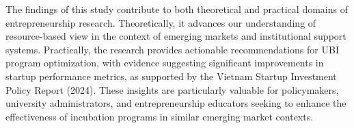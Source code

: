 \documentclass[../Main.tex]{subfiles}
\begin{document}
	The findings of this study contribute to both theoretical and practical domains of entrepreneurship research. Theoretically, it advances our understanding of resource-based view in the context of emerging markets and institutional support systems. Practically, the research provides actionable recommendations for UBI program optimization, with evidence suggesting significant improvements in startup performance metrics, as supported by the Vietnam Startup Investment Policy Report (2024). These insights are particularly valuable for policymakers, university administrators, and entrepreneurship educators seeking to enhance the effectiveness of incubation programs in similar emerging market contexts.
\end{document}
